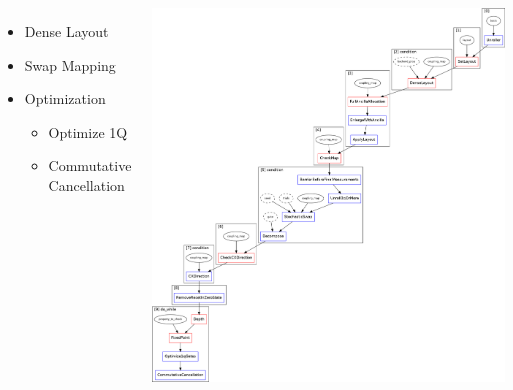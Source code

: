 \documentclass[aspectratio=169,11pt,hyperref={colorlinks=true}]{beamer}
\begin{document}
\begin{frame}
{\begin{columns}
\begin{itemize}
            \item Dense Layout
            \item Swap Mapping
            \item Optimization
                \begin{itemize}
                    \item Optimize 1Q
                    \item Commutative Cancellation
                \end{itemize}
        \end{itemize}
            \includegraphics[width=\textwidth,height=\textheight,keepaspectratio]{preset_level_2.png}
    \end{columns}
    }
\end{frame}
\end{document}
